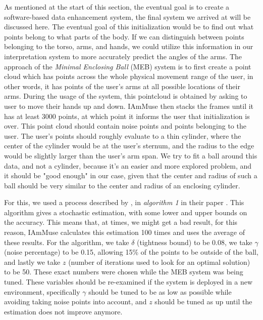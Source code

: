 As mentioned at the start of this section, the eventual goal is to create a software-based data enhancement system, the final system we arrived at will be discussed here.
The eventual goal of this initialization would be to find out what points belong to what parts of the body.
If we can distinguish between points belonging to the torso, arms, and hands, we could utilize this information in our interpretation system to more accurately predict the angles of the arms.
The approach of the \textit{Minimal Enclosing Ball} (MEB) system is to first create a point cloud which has points across the whole physical movement range of the user, in other words, it has points of the user's arms at all possible locations of their arms.
During the usage of the system, this pointcloud is obtained by asking to user to move their hands up and down.
IAmMuse then stacks the frames until it has at least 3000 points, at which point it informs the user that initialization is over.
This point cloud should contain noise points and points belonging to the user.
The user's points should roughly evaluate to a thin cylinder, where the center of the cylinder would be at the user's sternum, and the radius to the edge would be slightly larger than the user's arm span.
We try to fit a ball around this data, and not a cylinder, because it's an easier and more explored problem, and it should be "good enough" in our case, given that the center and radius of such a ball should be very similar to the center and radius of an enclosing cylinder.


For this, we used a process described by \citeauthor{ding2020sublinear}, in \textit{algorithm 1} in their paper \cite{ding2020sublinear}.
This algorithm gives a stochastic estimation, with some lower and upper bounds on the accuracy.
This means that, at times, we might get a bad result, for this reason, IAmMuse calculates this estimation 100 times and uses the average of these results.
For the algorithm, we take $\delta$ (tightness bound) to be 0.08, we take $\gamma$ (noise percentage) to be 0.15, allowing 15\% of the points to be outside of the ball, and lastly we take $z$ (number of iterations used to look for an optimal solution) to be 50.
These exact numbers were chosen while the MEB system was being tuned.
These variables should be re-examined if the system is deployed in a new environment, specifically $\gamma$ should be tuned to be as low as possible while avoiding taking noise points into account, and $z$ should be tuned as up until the estimation does not improve anymore.

